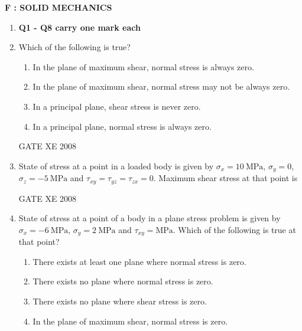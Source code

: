 \documentclass[12pt]{article}
\begin{document}
\newpage

\begin{center}
    \textbf{\Large F : SOLID MECHANICS}
\end{center}

\begin{enumerate}[label=Q\arabic*.]
\item[] \textbf{Q1 - Q8 carry one mark each}

\item Which of the following is true?  

\begin{enumerate}[label=(\Alph*)]

\item  In the plane of maximum shear, normal stress is always zero.
\item  In the plane of maximum shear, normal stress may not be always zero.
\item  In a principal plane, shear stress is never zero.
\item  In a principal plane, normal stress is always zero. 
\end{enumerate}

GATE XE 2008

\item State of stress at a point in a loaded body is given by $\sigma_x = 10 \ \text{MPa}$, $\sigma_y = 0$, $\sigma_z = -5 \ \text{MPa}$ and $\tau_{xy} = \tau_{yz} = \tau_{zx} = 0$. Maximum shear stress at that point is  

\begin{enumerate}[label=(\Alph*)]
\end{enumerate}

GATE XE 2008

\item State of stress at a point of a body in a plane stress problem is given by $\sigma_x = -6 \ \text{MPa}$, $\sigma_y = 2 \ \text{MPa}$ and $\tau_{xy} = \text{MPa}$. Which of the following is true at that point?  

\begin{enumerate}[label=(\Alph*)]
\item  There exists at least one plane where normal stress is zero. 
\item  There exists no plane where normal stress is zero.  
\item  There exists no plane where shear stress is zero.  
\item  In the plane of maximum shear, normal stress is zero. 
\end{enumerate}


\end{enumerate}
\end{document}
